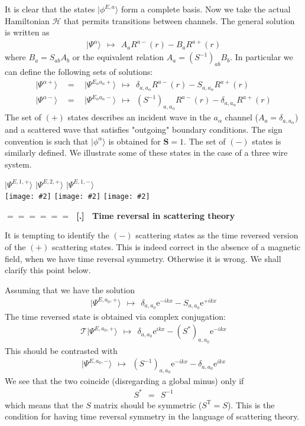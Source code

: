 \documentclass[onecolumn,fleqn]{revtex4}
\newcommand{\eexp}{\mathrm{e}^}
\newcommand{\tbox}[1]{\text{#1}}
\newcommand{\putgraph}[2][0.30\hsize]{\texttt{[image: \#2]}}
\newcommand{\beq}{\begin{eqnarray}}
\newcommand{\eeq}{\end{eqnarray}}
\renewcommand{\thesubsection}{\arabic{subsection}}
\renewcommand{\thesubsubsection}{\arabic{subsubsection}}
\newcommand{\sheadC}[1]
{
\addtocounter{subsubsection}{1}
\vspace{5mm}
{\Large\bf $=\!=\!=\!=\!=\!=\;$ [\thesubsection.\thesubsubsection] \ #1}  
\nopagebreak
\phantomsection
}
\begin{document}
It is clear that the states $|\phi^{E,a}\rangle$ form a complete basis. 
Now we take the actual Hamiltonian $\mathcal{H}$ that permits 
transitions between channels. The general solution is written as
\beq
|\Psi^{\alpha}\rangle  
\ \ \longmapsto \ \  
A_a R^{a-}(r) - B_a R^{a+}(r) 
\eeq
where $B_a = S_{ab}A_b$ or the equivalent relation $A_a=(S^{-1})_{ab}B_b$. 
In particular we can define the following sets of solutions: 
\beq
|\Psi^{\alpha+} \rangle 
& \ \ = \ \ & 
|\Psi^{E_{\alpha}a_{\alpha}+}\rangle 
\ \ \longmapsto \ \ 
\delta_{a,a_{\alpha}} R^{a-}(r) - S_{a,a_{\alpha}} R^{a+}(r) 
\\ \nonumber
|\Psi^{\alpha-} \rangle 
& \ \ = \ \ & 
|\Psi^{E_{\alpha}a_{\alpha}-}\rangle 
\ \ \longmapsto \ \ 
(S^{-1})_{a,a_{\alpha}} R^{a-}(r) - \delta_{a,a_{\alpha}} R^{a+}(r) 
\eeq
The set of $(+)$ states describes an incident wave 
in the $a_{\alpha}$ channel ($A_a=\delta_{a,a_{\alpha}}$)  
and a scattered wave that satisfies "outgoing" 
boundary conditions. The sign convention is such 
that ${|\phi^{\alpha}\rangle}$ is obtained for ${\bm{S}=1}$.
The set of $(-)$ states is similarly defined.
We illustrate some of these states 
in the case of a three wire system.

\begin{center}
$|\Psi^{E,1,+}\rangle$ 
\hspace{0.22\hsize} 
$|\Psi^{E,2,+}\rangle$ 
\hspace{0.25\hsize} 
$|\Psi^{E,1,-}\rangle$ \\
\putgraph[0.2\hsize]{ThreeWiresFirstStateScattering.jpg}
\hspace{0.1\hsize} 
\putgraph[0.2\hsize]{ThreeWiresSecondStateScattering.jpg}
\hspace{0.1\hsize} 
\putgraph[0.2\hsize]{ThreeWiresFirstStateScatteringR.jpg}
\end{center}




\sheadC{Time reversal in scattering theory}

It is tempting to identify the $(-)$ scattering states  
as the time reversed version of the $(+)$
scattering states.
This is indeed correct in the absence 
of a magnetic field, when we have time reversal 
symmetry. Otherwise it is wrong.  
We shall clarify this point below.

Assuming that we have the solution 
\beq
|\Psi^{E,a_0,+}\rangle 
\ \ \longmapsto \ \ 
\delta_{a,a_0}\eexp{-ikx} - S_{a,a_0}\eexp{+ikx}
\eeq
The time reversed state is obtained via complex conjugation: 
\beq
\mathcal{T}|\Psi^{E,a_0,+}\rangle 
\ \ \longmapsto \ \ 
\delta_{a,a_0}\eexp{ikx} - (S^*)_{a,a_0}\eexp{-ikx}
\eeq
This should be contrasted with 
\beq
|\Psi^{E,a_0,-}\rangle 
\ \ \longmapsto \ \ 
(S^{-1})_{a,a_0} \eexp{-ikx} - \delta_{a,a_0}\eexp{ikx} 
\eeq
We see that the two coincide (disregarding a global minus) only if 
\beq
S^* \ \ = \ \ S^{-1}
\eeq
which means that the $S$ matrix should be symmetric ($S^{\tbox{T}}=S$). 
This is the condition for having time reversal symmetry 
in the language of scattering theory. 
\end{document}
